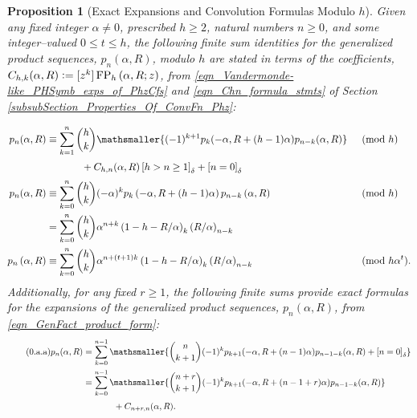 \documentclass[12pt,reqno]{article}
\renewenvironment{subequations}{%
  \refstepcounter{equation}%
  \edef\theparentequation{\theequation}%
  \setcounter{parentequation}{\value{equation}}%
  \setcounter{equation}{0}%
  \def\theequation{\theparentequation.\alph{equation}}%
  \ignorespaces
}{%
  \setcounter{equation}{\value{parentequation}}%
  \ignorespacesafterend
}
\numberwithin{sfootnote}{section}
\numberwithin{equation}{section}
\newcommand{\tagonce}[0]{
     \addtocounter{equation}{1}
     \tag{\theequation}
}
\theoremstyle{DefaultTheoremStyle}
\newtheorem{prop}[theorem]{Proposition}
\theoremstyle{definition}
\newcommand{\defequals}{\ensuremath{\vcentcolon=}}
\newcommand{\Pochhammer}[2]{\ensuremath{\left(#1\right)_{#2}}}
\newcommand{\Iverson}[1]{\ensuremath{\left[#1\right]_{\delta}}}
\newcommand{\pn}[3]{\ensuremath{p_{#1}\left(#2, #3\right)}}
\newcommand{\ConvFP}[4]{\ensuremath{\FP_{#1}\left(#2, #3; #4\right)}}
\DeclareMathOperator{\FP}{FP}
\begin{document}
\begin{prop}[Exact Expansions and Convolution Formulas Modulo $h$] 
\label{prop_ExactFormulas_CongruencesModh_from_FiniteDiffEqns} 
Given any fixed integer $\alpha \neq 0$, prescribed $h \geq 2$, 
natural numbers $n \geq 0$, and some 
integer--valued $0 \leq t \leq h$, the 
following finite sum identities for the 
generalized product sequences, $\pn{n}{\alpha}{R}$, modulo $h$ 
are stated in terms of the coefficients, 
$C_{h,k}(\alpha, R) \defequals [z^{k}] \ConvFP{h}{\alpha}{R}{z}$, 
from \eqref{eqn_Vandermonde-like_PHSymb_exps_of_PhzCfs} and 
\eqref{eqn_Chn_formula_stmts} of 
Section \ref{subsubSection_Properties_Of_ConvFn_Phz}: 
\begin{subequations} 
\label{eqn_pnAlphaR_seqs_finite_sum_reps_modulop} 
\begin{align} 
\label{eqn_pnAlphaR_seqs_finite_sum_reps_modulop-stmts_v0} 
p_{n}(\alpha, R) & \equiv 
     \sum\limits_{k=1}^{n} 
     \binom{h}{k} 
     \mathsmaller{ 
     (-1)^{k+1} 
     p_{k}(-\alpha, R + (h-1) \alpha) p_{n-k}(\alpha, R) 
     } && \pmod{h} \\ 
\notag 
     & \phantom{\equiv\sum\quad} + 
     C_{h,n}(\alpha, R) \Iverson{h > n \geq 1} + \Iverson{n = 0} 
     && \\ 
\label{eqn_pnAlphaR_seqs_finite_sum_reps_modulop-stmts_v1} 
p_{n}(\alpha, R) & \equiv 
     \sum\limits_{k=0}^{n} \binom{h}{k} (-\alpha)^{k} 
     \pn{k}{-\alpha}{R + (h-1) \alpha} \pn{n-k}{\alpha}{R} 
     && \pmod{h} \\ 
\notag 
     & = %
     \sum\limits_{k=0}^{n} \binom{h}{k} \alpha^{n+k} 
     \Pochhammer{1-h-R / \alpha}{k} \Pochhammer{R / \alpha}{n-k} 
     && \\ 
\label{eqn_pnAlphaR_seqs_finite_sum_reps_modulop-stmts_v2} 
\pn{n}{\alpha}{R} & \equiv 
     \sum\limits_{k=0}^{n} \binom{h}{k} \alpha^{n+(t+1)k} 
     \Pochhammer{1-h-R / \alpha}{k} \Pochhammer{R / \alpha}{n-k} 
     && \pmod{h \alpha^{t}}. 
\end{align} 
\end{subequations} 
Additionally, for any fixed $r \geq 1$, the following finite sums 
provide exact formulas for the expansions of the 
generalized product sequences, 
$\pn{n}{\alpha}{R}$, from \eqref{eqn_GenFact_product_form}: 
\begin{align*} 
\tagonce\label{eqn_pnAlphaR_seqs_exact_finite_sum_reps-stmts_v2} 
p_{n}(\alpha, R) 
     & = 
     \sum_{k=0}^{n-1} 
     \mathsmaller{ 
     \binom{n}{k+1} (-1)^{k} 
     p_{k+1}(-\alpha, R + (n-1) \alpha) p_{n-1-k}(\alpha, R) + 
     \Iverson{n = 0} 
     } \\ 
     & = 
     \sum_{k=0}^{n-1} 
     \mathsmaller{ 
     \binom{n+r}{k+1} (-1)^{k} 
     p_{k+1}(-\alpha, R + (n-1+r) \alpha) 
     p_{n-1-k}(\alpha, R) 
     } \\ 
     & \phantom{= \sum \quad} + 
     C_{n+r,n}(\alpha, R). 
\end{align*} 
\end{prop} 
\end{document}

